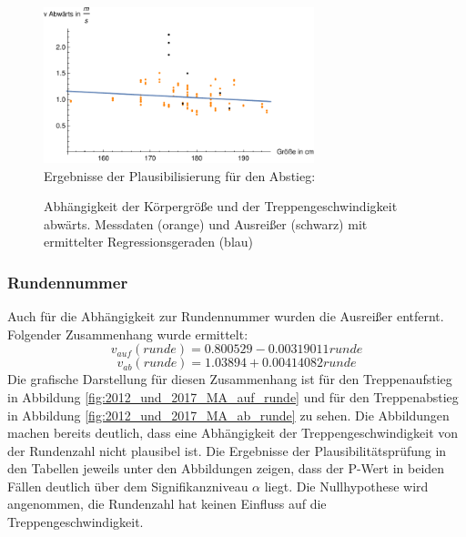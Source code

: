 \begin{figure}[htpb]
\centering
\includegraphics[width=0.7\textwidth]{abbildungen/regression/2012_2017_verbund/ohneausreisser/ab-groesse.pdf}
\justify \ \\
Ergebnisse der Plausibilisierung für den Abstieg:

\caption{Abhängigkeit der Körpergröße und der Treppengeschwindigkeit abwärts. Messdaten (orange) und Ausreißer (schwarz) mit ermittelter Regressionsgeraden (blau)}
\label{fig:2012_und_2017_MA_ab_groesse}
\end{figure}




















\subsubsection{Rundennummer}
Auch für die Abhängigkeit zur Rundennummer wurden die Ausreißer entfernt. Folgender Zusammenhang wurde ermittelt:
\begin{equation}
v_{auf}(runde) = 0.800529 -0.00319011 runde
\label{eq:2012_2017_AufRunde_MA}
\end{equation}
\begin{equation}
v_{ab}(runde) = 1.03894 + 0.00414082 runde
\label{eq:2012_2017_AbRunde_MA}
\end{equation}
Die grafische Darstellung für diesen Zusammenhang ist für den Treppenaufstieg in Abbildung \ref{fig:2012_und_2017_MA_auf_runde} und für den Treppenabstieg in Abbildung \ref{fig:2012_und_2017_MA_ab_runde} zu sehen. Die Abbildungen machen bereits deutlich, dass eine Abhängigkeit der Treppengeschwindigkeit von der Rundenzahl nicht plausibel ist. Die Ergebnisse der Plausibilitätsprüfung in den Tabellen jeweils unter den Abbildungen zeigen, dass der P-Wert in beiden Fällen deutlich über dem Signifikanzniveau $\alpha$ liegt. Die Nullhypothese wird angenommen, die Rundenzahl hat keinen Einfluss auf die Treppengeschwindigkeit.












